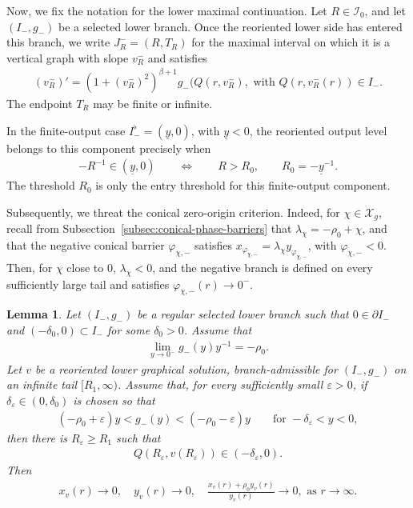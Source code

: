\documentclass{amsart}
\theoremstyle{plain}
\newtheorem{lemma}[theorem]{Lemma}
\theoremstyle{mainintrothm}
\theoremstyle{definition}
\begin{document}
Now, we fix the notation for the lower maximal continuation.  Let
$R\in\mathcal I_0$, and let $(I_-,g_-)$ be a selected lower branch.  Once the
reoriented lower side has entered this branch, we write $J_R^-=(R,T_R)$ for the
maximal interval on which it is a vertical graph with slope $v_R^-$ and
satisfies
\begin{align}
	\label{eq:maximal-lower-selected-component}
  (v_R^-)'=(1+(v_R^-)^2)^{\beta+1}g_-(Q(r,v_R^-),\mbox{ with }	Q(r,v_R^-(r))\in I_-.
\end{align}
The endpoint $T_R$ may be finite or infinite.

\medskip

In the finite-output case $I_-^\flat=(\underline y,0)$, with
$\underline y<0$, the reoriented output level belongs to this component
precisely when
\begin{align}
	\label{eq:finite-output-threshold-section-six}
	-R^{-1}\in(\underline y,0)
	\qquad
	\Longleftrightarrow
	\qquad
	R>R_0,
	\qquad
	R_0=-\underline{y}^{-1}.
\end{align}
The threshold $R_0$ is only the entry threshold for this finite-output
component.

\medskip

Subsequently, we threat  the conical zero-origin criterion.  Indeed, for $\chi\in\mathcal X_g$,
recall from Subsection~\ref{subsec:conical-phase-barriers} that
$\lambda_\chi=-\rho_0+\chi$, and that the negative conical barrier
$\varphi_{\chi,-}$ satisfies $x_{\varphi_{\chi,-}}=\lambda_\chi y_{\varphi_{\chi,-}}$, with $\varphi_{\chi,-}<0$. Then, for $\chi$ close to $0$, $\lambda_\chi<0$, and the negative branch is defined
on every sufficiently large tail and satisfies $\varphi_{\chi,-}(r)\to0^-$.

\begin{lemma}
	\label{lem:conical-barriers-zero-origin-return}
	Let $(I_-,g_-)$ be a regular selected lower branch such that
	$0\in\partial I_-$ and $(-\delta_0,0)\subset I_-$ for some $\delta_0>0$.
	Assume that
	\begin{align}
		\label{eq:selected-conical-trace-lower-branch}
		\lim\limits_{y\to0^-}g_-(y)y^{-1}=-\rho_0.
	\end{align}
	Let $v$ be a reoriented lower graphical solution, branch-admissible for
	$(I_-,g_-)$ on an infinite tail $[R_1,\infty)$.  Assume that, for every
	sufficiently small $\varepsilon>0$, if
	$\delta_\varepsilon\in(0,\delta_0)$ is chosen so that
	\begin{align}
		\label{eq:lower-branch-ray-squeezing}
		(-\rho_0+\varepsilon)y
		<
		g_-(y)
		<
		(-\rho_0-\varepsilon)y
		\qquad
		\text{for }-\delta_\varepsilon<y<0,
	\end{align}
	then there is $R_\varepsilon\ge R_1$ such that
	\begin{align}
		\label{eq:lower-level-enters-conical-tail}
		Q(R_\varepsilon,v(R_\varepsilon))
		\in
		(-\delta_\varepsilon,0).
	\end{align}
	Then
	\begin{align*}
		x_v(r)\to0,
		\quad
		y_v(r)\to0,
		\quad
		\frac{x_v(r)+\rho_0y_v(r)}
		{y_v(r)}
		\to0,\mbox{ as }r\to\infty.
	\end{align*}
\end{lemma}
\end{document}
